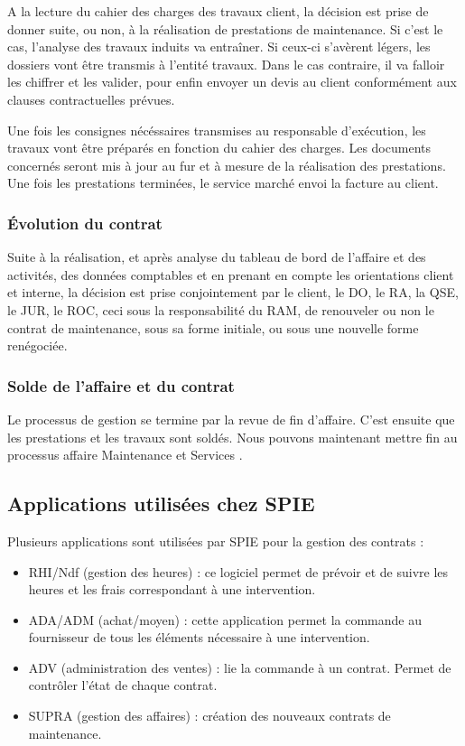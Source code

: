 A la lecture du cahier des charges des travaux client, la décision est prise de donner suite, ou non, à la réalisation de prestations de maintenance. Si c'est le cas, l'analyse des travaux induits va entraîner. Si ceux-ci s'avèrent légers, les dossiers vont être transmis à l'entité travaux. Dans le cas contraire, il va falloir les chiffrer et les valider, pour enfin envoyer un devis au client conformément aux clauses contractuelles prévues.

Une fois les consignes nécéssaires transmises au responsable d'exécution, les travaux vont être préparés en fonction du cahier des charges. Les documents concernés seront mis à jour au fur et à mesure de la réalisation des prestations. Une fois les prestations terminées, le service marché envoi la facture au client.

\subsubsection{Évolution du contrat}

Suite à la réalisation, et après analyse du tableau de bord de l'affaire et des activités, des données comptables et en prenant en compte les orientations client et interne, la décision est prise conjointement par le client, le DO, le RA, la QSE, le JUR, le ROC, ceci sous la responsabilité du RAM, de renouveler ou non le contrat de maintenance, sous sa forme initiale, ou sous une nouvelle forme renégociée.

\subsubsection{Solde de l’affaire et du contrat}

Le processus de gestion se termine par la revue de fin d'affaire. C'est ensuite que les prestations et les travaux sont soldés. Nous pouvons maintenant mettre fin au processus affaire \og Maintenance et Services \fg.

\subsection{Applications utilisées chez SPIE}

Plusieurs applications sont utilisées par SPIE pour la gestion des contrats :

\begin{itemize}
\item RHI/Ndf (gestion des heures) : ce logiciel permet de prévoir et de suivre les heures et les frais correspondant à une intervention.
\item ADA/ADM (achat/moyen) : cette application permet la commande au fournisseur de tous les éléments nécessaire à une intervention.
\item ADV (administration des ventes) : lie la commande à un contrat. Permet de contrôler l’état de chaque contrat.
\item SUPRA (gestion des affaires) : création des nouveaux contrats de maintenance.
\end{itemize}

